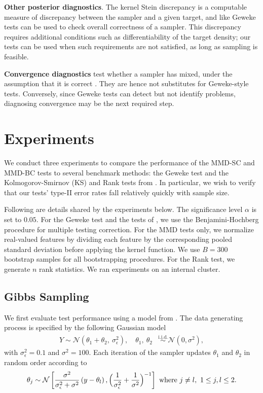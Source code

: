 \documentclass{article}
\begin{document}
{\noindent\bf Other posterior diagnostics}.
The kernel Stein discrepancy \citep{Chwialkowski2016, Gorham2017, liu_kernelized_2016} is a computable measure of discrepancy between the sampler and a given target, and like Geweke tests can be used to check overall correctness of a sampler. 
This discrepancy requires additional conditions such as differentiability of the target density; our tests can be used when such requirements are not satisfied, as long as sampling is feasible.

{\noindent\bf Convergence diagnostics} test whether a sampler has mixed, under the assumption that it is correct \citep[e.g.][]{robert_short_2011}. They are hence not substitutes for Geweke-style tests. Conversely, since Geweke tests can detect but not identify problems, diagnosing convergence may be the next required step. 


\section{Experiments}\label{sec:experiments}
We conduct three experiments to compare the performance of the MMD-SC and MMD-BC tests to several benchmark methods: the Geweke test and the Kolmogorov-Smirnov (KS) and Rank tests from \cite{gandy_unit_2020}. 
In particular, we wish to verify that our tests' type-II error rates fall relatively quickly with sample size. 

Following are details shared by the experiments below.
The significance level $\alpha$ is set to $0.05.$
For the Geweke test and the tests of \cite{gandy_unit_2020}, 
we use the Benjamini-Hochberg procedure \citep{benjamini_controlling_1995} for multiple testing correction. 
For the MMD tests only,
we normalize real-valued features by dividing each feature by the corresponding pooled standard deviation before applying the kernel function. We use $B=300$ bootstrap samples for all bootstrapping procedures. 
For the Rank test, we generate $n$ rank statistics. We ran experiments on an internal cluster.

\subsection{Gibbs Sampling}
We first evaluate test performance using a model from \cite{gandy_unit_2020}. 
The data generating process is specified by the following Gaussian model
\begin{align}
    Y \sim \mathcal{N}(\theta_1+\theta_2,\ \sigma^2_{\epsilon}),\quad  \theta_1,\ \theta_2 &\overset{\mathrm{i.i.d.}}{\sim}\mathcal{N}(0, \sigma^2), 
    \label{eq:ex1}
\end{align}
with $\sigma_{\epsilon}^{2}=0.1$ and $\sigma^{2}=100$. Each iteration of the sampler updates $\theta_{1}$ and $\theta_{2}$ in random order according to 
\begin{align}
\theta_{j} \sim \mathcal{N}\left[
\frac{\sigma^{2}}{\sigma_{\epsilon}^{2}+\sigma^{2}}\left(y-\theta_{l}\right)
, \Bigl(\frac{1}{\sigma_{\epsilon}^{2}}+\frac{1}{\sigma^{2}}\Bigr)^{-1}\right]\ \text{where } j \neq l,\ 1\leq j,l\leq 2.
\end{align}
\end{document}
